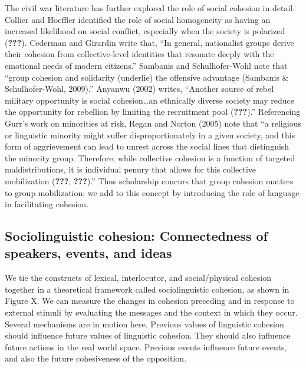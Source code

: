 \documentclass[english,man]{apa6}
\begin{document}
The civil war literature has further explored the role of social cohesion in detail. Collier and Hoeffler identified the role of social homogeneity as having an increased likelihood on social conflict, especially when the society is polarized ({\textbf{???}}). Cederman and Girardin write that, \enquote{In general, nationalist groups derive their cohesion from collective-level identities that resonate deeply with the emotional needs of modern citizens.} Sambanis and Schulhofer-Wohl note that \enquote{group cohesion and solidarity (underlie) the offensive advantage (Sambanis \& Schulhofer-Wohl, 2009).} Anyanwu (2002) writes, \enquote{Another source of rebel military opportunity is social cohesion\ldots{}an ethnically diverse society may reduce the opportunity for rebellion by limiting the recruitment pool ({\textbf{???}}).} Referencing Gurr's work on minorities at risk, Regan and Norton (2005) note that \enquote{a religious or linguistic minority might suffer disproportionately in a given society, and this form of aggrievement can lead to unrest across the social lines that distinguish the minority group. Therefore, while collective cohesion is a function of targeted maldistributions, it is individual penury that allows for this collective mobilization ({\textbf{???}}; {\textbf{???}}).} Thus scholarship concurs that group cohesion matters to group mobilization; we add to this concept by introducing the role of language in facilitating cohesion.

\hypertarget{sociolinguistic-cohesion-connectedness-of-speakers-events-and-ideas}{%
\subsection{Sociolinguistic cohesion: Connectedness of speakers, events, and ideas}\label{sociolinguistic-cohesion-connectedness-of-speakers-events-and-ideas}}

We tie the constructs of lexical, interlocutor, and social/physical cohesion together in a theoretical framework called sociolinguistic cohesion, as shown in Figure X. We can measure the changes in cohesion preceding and in response to external stimuli by evaluating the messages and the context in which they occur. Several mechanisms are in motion here. Previous values of linguistic cohesion should influence future values of linguistic cohesion. They should also influence future actions in the real world space. Previous events influence future events, and also the future cohesiveness of the opposition.
\end{document}
